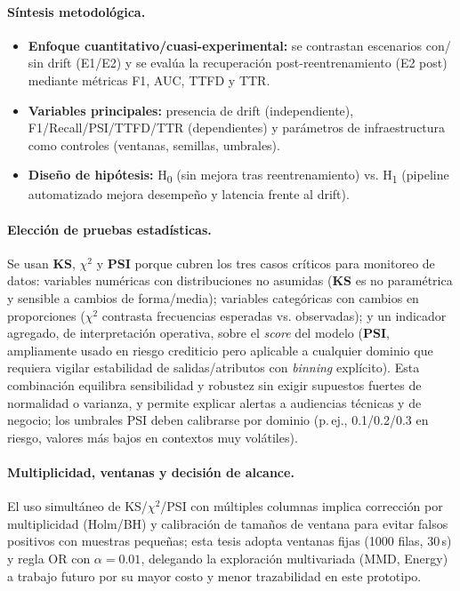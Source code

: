 \paragraph{Síntesis metodológica.}
\begin{itemize}
  \item \textbf{Enfoque cuantitativo/cuasi-experimental:} se contrastan escenarios con/ sin drift (E1/E2) y se evalúa la recuperación post-reentrenamiento (E2 post) mediante métricas F1, AUC, TTFD y TTR.
  \item \textbf{Variables principales:} presencia de drift (independiente), F1/Recall/PSI/TTFD/TTR (dependientes) y parámetros de infraestructura como controles (ventanas, semillas, umbrales).
  \item \textbf{Diseño de hipótesis:} H\textsubscript{0} (sin mejora tras reentrenamiento) vs. H\textsubscript{1} (pipeline automatizado mejora desempeño y latencia frente al drift).
\end{itemize}

\paragraph{Elección de pruebas estadísticas.}
Se usan \textbf{KS}, \textbf{$\chi^2$} y \textbf{PSI} porque cubren los tres casos críticos para monitoreo de datos: variables numéricas con distribuciones no asumidas (\textbf{KS} es no paramétrica y sensible a cambios de forma/media); variables categóricas con cambios en proporciones (\textbf{$\chi^2$} contrasta frecuencias esperadas vs. observadas); y un indicador agregado, de interpretación operativa, sobre el \textit{score} del modelo (\textbf{PSI}, ampliamente usado en riesgo crediticio pero aplicable a cualquier dominio que requiera vigilar estabilidad de salidas/atributos con \textit{binning} explícito). Esta combinación equilibra sensibilidad y robustez sin exigir supuestos fuertes de normalidad o varianza, y permite explicar alertas a audiencias técnicas y de negocio; los umbrales PSI deben calibrarse por dominio (p.\,ej., 0.1/0.2/0.3 en riesgo, valores más bajos en contextos muy volátiles).

\paragraph{Multiplicidad, ventanas y decisión de alcance.}
El uso simultáneo de KS/$\chi^2$/PSI con múltiples columnas implica corrección por multiplicidad (Holm/BH) y calibración de tamaños de ventana para evitar falsos positivos con muestras pequeñas; esta tesis adopta ventanas fijas (1000 filas, 30\,s) y regla OR con \(\alpha=0.01\), delegando la exploración multivariada (MMD, Energy) a trabajo futuro por su mayor costo y menor trazabilidad en este prototipo.

